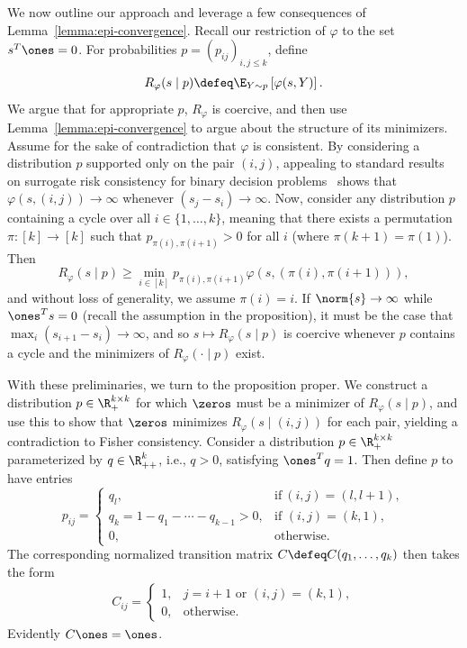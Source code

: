 \documentclass[11pt]{article}
\newcommand{\sloss}{\varphi}  %
\begin{document}
We now outline our approach and leverage a few consequences
of Lemma~\ref{lemma:epi-convergence}.
%
Recall our restriction of $\sloss$ to the set $s^T \ones = 0$.
%
For probabilities
$p = (p_{ij})_{i,j \le k}$, define
\begin{equation*}
  R_\sloss(s \mid p) \defeq
  \E_{Y \sim p}\left[\sloss(s, Y)\right].
\end{equation*}
We argue that for appropriate $p$, $R_\sloss$ is coercive, and then use
Lemma~\ref{lemma:epi-convergence} to argue about the structure of its
minimizers.
%
Assume for the sake of contradiction that $\sloss$ is
consistent.
%
By considering a distribution $p$ supported only on the pair $(i, j)$,
appealing to standard results on surrogate risk consistency for binary
decision problems~\citep{BartlettJoMc06} shows that $\sloss(s, (i, j)) \to
\infty$ whenever $(s_j - s_i) \to \infty$.
%
Now, consider any distribution $p$ containing a
cycle over all $i \in \{1, \ldots, k\}$, meaning that there exists a
permutation $\pi : [k] \to [k]$ such that $p_{\pi(i),\pi(i+1)} > 0$ for all
$i$ (where $\pi(k+1) = \pi(1)$).
%
Then
\begin{equation*}
  R_\sloss(s \mid p) \ge \min_{i \in [k]} p_{\pi(i), \pi(i + 1)}
  \sloss(s, (\pi(i), \pi(i + 1))),
\end{equation*}
and without loss of generality, we assume $\pi(i) = i$.
%
If $\norm{s} \to \infty$ while $\ones^T s = 0$ (recall the assumption in the
proposition), it must be the case that $\max_i (s_{i + 1} - s_i) \to
\infty$, and so $s \mapsto R_\sloss(s \mid p)$ is coercive whenever $p$
contains a cycle and the minimizers of $R_\sloss(\cdot \mid p)$ exist.

With these preliminaries, we turn to the proposition proper.
%
We construct a distribution $p \in \R^{k \times k}_+$ for which $\zeros$
must be a minimizer of $R_\sloss(s \mid p)$, and use this to show that
$\zeros$ minimizes $R_\sloss(s \mid (i, j))$ for each pair, yielding a
contradiction to Fisher consistency.
%
Consider a distribution $p \in \R_+^{k \times k}$
parameterized by $q \in \R^k_{++}$, i.e., $q > 0$,
satisfying $\ones^T q = 1$.
%
Then define $p$ to have entries
\begin{equation}
  \label{eqn:construction-p-ranking}
  p_{ij} = \begin{cases}
    q_l, & \mbox{if}~ (i,j) = (l, l+1), \\
    q_k = 1 - q_1 - \cdots - q_{k-1} > 0, & \mbox{if~}
    (i,j) = (k,1), \\
    0, & \text{otherwise}.
  \end{cases}
\end{equation}
The corresponding normalized transition matrix $C \defeq C(q_1,\ldots,q_k)$
then takes the form
\begin{align*}
  C_{ij} = \begin{cases}
    1, & j=i+1 \text{ or }(i,j) = (k, 1), \\
    0, & \text{otherwise}.
  \end{cases}
\end{align*}
Evidently $C \ones = \ones$.
\end{document}

